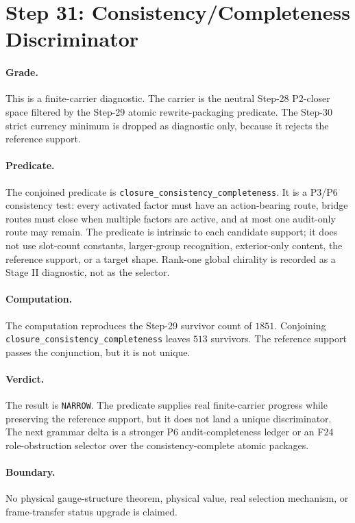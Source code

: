 \section{Step 31: Consistency/Completeness Discriminator}

\paragraph{Grade.}
This is a finite-carrier diagnostic.  The carrier is the neutral Step-28 P2-closer space filtered by the Step-29 atomic rewrite-packaging predicate.  The Step-30 strict currency minimum is dropped as diagnostic only, because it rejects the reference support.

\paragraph{Predicate.}
The conjoined predicate is \texttt{closure\_consistency\_completeness}.  It is a P3/P6 consistency test: every activated factor must have an action-bearing route, bridge routes must close when multiple factors are active, and at most one audit-only route may remain.  The predicate is intrinsic to each candidate support; it does not use slot-count constants, larger-group recognition, exterior-only content, the reference support, or a target shape.  Rank-one global chirality is recorded as a Stage II diagnostic, not as the selector.

\paragraph{Computation.}
The computation reproduces the Step-29 survivor count of \(1851\).  Conjoining \texttt{closure\_consistency\_completeness} leaves \(513\) survivors.  The reference support passes the conjunction, but it is not unique.

\paragraph{Verdict.}
The result is \texttt{NARROW}.  The predicate supplies real finite-carrier progress while preserving the reference support, but it does not land a unique discriminator.  The next grammar delta is a stronger P6 audit-completeness ledger or an F24 role-obstruction selector over the consistency-complete atomic packages.

\paragraph{Boundary.}
No physical gauge-structure theorem, physical value, real selection mechanism, or frame-transfer status upgrade is claimed.
